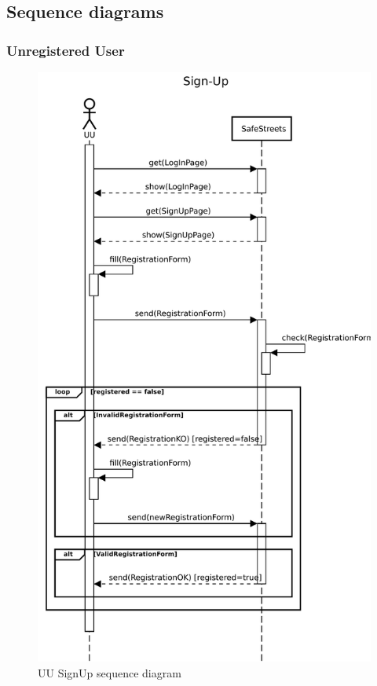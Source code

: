 			\subsection{Sequence diagrams}
				\subsubsection{Unregistered User}
					\begin{figure}[!h]
								\centering
							\includegraphics[height=0.85\textheight] {images/SequenceDiagram/SignUp.pdf}
								\caption{UU SignUp sequence diagram}
						\end{figure}
